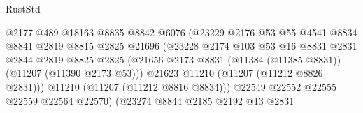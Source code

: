 \begin{lexlean}{RustStd}
\begin{coremodule}
                                          @2177
                                          @489
                                          @18163
                                          @8835
                                          @8842
                                          @6076
                                          (@23229
                                            @2176
                                            @53
                                            @55
                                            @4541
                                            @8834
                                            @8841
                                            @2819
                                            @8815
                                            @2825
                                            @21696
                                            (@23228
                                              @2174
                                              @103
                                              @53
                                              @16
                                              @8831
                                              @2831
                                              @2844
                                              @2819
                                              @8825
                                              @2825
                                              (@21656
                                                @2173
                                                @8831
                                                (@11384 (@11385 @8831))
                                                (@11207 (@11390 @2173 @53)))
                                              @21623
                                              @11210
                                              (@11207 (@11212 @8826 @2831)))
                                            @11210
                                            (@11207 (@11212 @8816 @8834)))
                                          @22549
                                          @22552
                                          @22555
                                          @22559
                                          @22564
                                          @22570)
                                        (@23274
                                          @8844
                                          @2185
                                          @2192
                                          @13
                                          @2831

\end{coremodule}
\end{lexlean}
